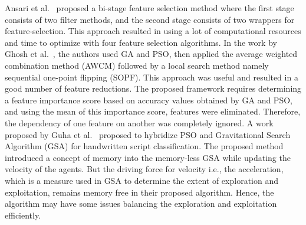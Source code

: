 \documentclass[final,3p,times]{elsarticle}
\begin{document}
Ansari et al.~\cite{ansari2019hybrid} proposed a bi-stage feature selection method where the first stage consists of two filter methods, and the second stage consists of two {wrappers for feature-selection}. This approach resulted in using a lot of computational resources and time to optimize with four feature selection algorithms. In the work by Ghosh et al.~\cite{ghosh2020binary}, the authors used GA and PSO, then applied the average weighted combination method (AWCM) followed by a local search method namely sequential one-point flipping (SOPF). This approach was useful and resulted in a good number of feature reductions. The proposed framework requires determining a feature importance score based on {accuracy values} obtained by GA and PSO, and using the mean of this importance {score,} features were eliminated. Therefore, the dependency of one feature on another was completely ignored. A work proposed by Guha et al.~\cite{guha2021hybrid} proposed to hybridize PSO and Gravitational Search Algorithm (GSA) for handwritten script classification. The proposed method introduced a concept of memory into the memory-less GSA while updating the velocity of the agents. But the driving force {for} velocity i.e., the acceleration, which is a measure used in GSA to determine the extent of exploration and exploitation, remains memory free in their proposed algorithm. Hence, the algorithm may have some issues balancing the exploration and exploitation {efficiently.}\\
\end{document}
